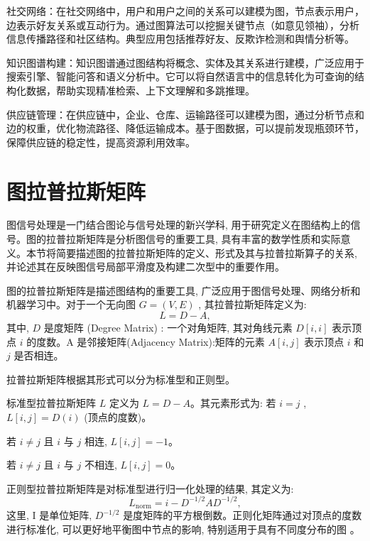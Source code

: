 社交网络：在社交网络中，用户和用户之间的关系可以建模为图，节点表示用户，边表示好友关系或互动行为。通过图算法可以挖掘关键节点（如意见领袖），分析信息传播路径和社区结构。典型应用包括推荐好友、反欺诈检测和舆情分析等。

知识图谱构建：知识图谱通过图结构将概念、实体及其关系进行建模，广泛应用于搜索引擎、智能问答和语义分析中。它可以将自然语言中的信息转化为可查询的结构化数据，帮助实现精准检索、上下文理解和多跳推理。

供应链管理：在供应链中，企业、仓库、运输路径可以建模为图，通过分析节点和边的权重，优化物流路径、降低运输成本。基于图数据，可以提前发现瓶颈环节，保障供应链的稳定性，提高资源利用效率。


\section{图拉普拉斯矩阵}

图信号处理是一门结合图论与信号处理的新兴学科, 用于研究定义在图结构上的信号。图的拉普拉斯矩阵是分析图信号的重要工具, 具有丰富的数学性质和实际意义。本节将简要描述图的拉普拉斯矩阵的定义、形式及其与拉普拉斯算子的关系, 并论述其在反映图信号局部平滑度及构建二次型中的重要作用。

图的拉普拉斯矩阵是描述图结构的重要工具, 广泛应用于图信号处理、网络分析和机器学习中。对于一个无向图 \(G = \left( {V, E}\right)\) , 其拉普拉斯矩阵定义为:
\[
L = D - {A}, 
\]
其中, \(D\) 是度矩阵 (Degree Matrix) : 一个对角矩阵, 其对角线元素 \(D\left\lbrack  {i, i}\right\rbrack\) 表示顶点 \(i\) 的度数。A 是邻接矩阵(Adjacency Matrix):矩阵的元素 \({A}\left\lbrack  {i, j}\right\rbrack\) 表示顶点 \(i\) 和 \(j\) 是否相连。

拉普拉斯矩阵根据其形式可以分为标准型和正则型。

标准型拉普拉斯矩阵 \(L\) 定义为 \(L = D - {A}\)。其元素形式为: 若 \(i = j\) , \(L\left\lbrack  {i, j}\right\rbrack   = D(i)\) (顶点的度数)。

若 \(i \neq  j\) 且 \(i\) 与 \(j\) 相连, \(L\left\lbrack  {i, j}\right\rbrack   =  - 1\)。

若 \(i \neq  j\) 且 \(i\) 与 \(j\) 不相连, \(L\left\lbrack  {i, j}\right\rbrack   = 0\)。

正则型拉普拉斯矩阵是对标准型进行归一化处理的结果, 其定义为:
\[
L_\mathrm{norm} = i - {D}^{-1/2}{A}{D}^{-1/2}, 
\]
这里, I 是单位矩阵, \({D}^{-1/2}\) 是度矩阵的平方根倒数。正则化矩阵通过对顶点的度数进行标准化, 可以更好地平衡图中节点的影响, 特别适用于具有不同度分布的图 \parencite{1997_Chung_Spectral_Graph_Theory}。

